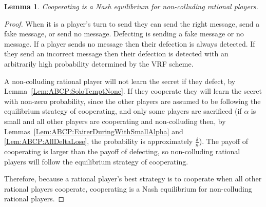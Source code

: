 \documentclass{dalcsthesis}
\newtheorem{lemma}{Lemma}
\begin{document}
\begin{lemma}Cooperating is a Nash equilibrium for non-colluding rational players.\end{lemma}
\begin{proof}
When it is a player's turn to send they can send the right message, send a fake message, or send no message. Defecting is sending a fake message or no message. If a player sends no message then their defection is always detected. If they send an incorrect message then their defection is detected with an arbitrarily high probability determined by the VRF scheme.

A non-colluding rational player will not learn the secret if they defect, by Lemma~\ref{Lem:ABCP:SoloTemptNone}. If they cooperate they will learn the secret with non-zero probability, since the other players are assumed to be following the equilibrium strategy of cooperating, and only some players are sacrificed (if $\alpha$ is small and all other players are cooperating and non-colluding then, by Lemmas~\ref{Lem:ABCP:FairerDuringWithSmallAlpha} and \ref{Lem:ABCP:AllDeltaLose}, the probability is approximately $\frac{\delta}{n}$). The payoff of cooperating is larger than the payoff of defecting, so non-colluding rational players will follow the equilibrium strategy of cooperating.

Therefore, because a rational player's best strategy is to cooperate when all other rational players cooperate, cooperating is a Nash equilibrium for non-colluding rational players. 
\end{proof}
\end{document}
